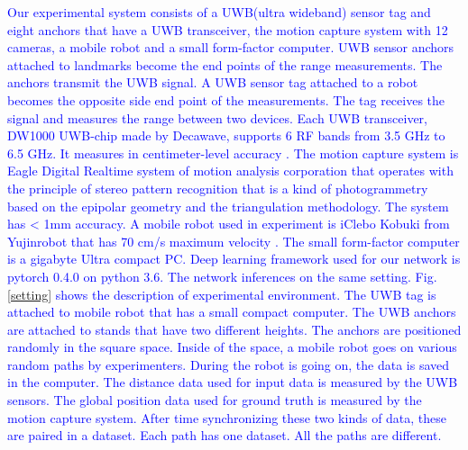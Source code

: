 \documentclass[letterpaper, 10 pt, conference]{ieeeconf}  %
\begin{document}
 \textcolor{blue}{Our experimental system consists of a UWB(ultra wideband) sensor tag and eight anchors that have a UWB transceiver, the motion capture system with 12 cameras, a mobile robot and a small form-factor computer. UWB sensor anchors attached to landmarks become the end points of the range measurements. The anchors transmit the UWB signal. A UWB sensor tag attached to a robot becomes the opposite side end point of the measurements. The tag receives the signal and measures the range between two devices. Each UWB transceiver, DW1000 UWB-chip made by Decawave, supports 6 RF bands from 3.5 GHz to 6.5 GHz. It measures in centimeter-level accuracy . The motion capture system is Eagle Digital Realtime system of motion analysis corporation that operates with the principle of stereo pattern recognition that is a kind of photogrammetry based on the epipolar geometry and the triangulation methodology. The system has < 1mm accuracy. A mobile robot used in experiment is iClebo Kobuki from Yujinrobot that has 70 cm/s maximum velocity . The small form-factor computer is a gigabyte Ultra compact PC. Deep learning framework used for our network is pytorch 0.4.0 on python 3.6. The network inferences on the same setting.
 Fig. \ref{setting} shows the description of experimental environment. The UWB tag is attached to mobile robot that has a small compact computer. The UWB anchors are attached to stands that have two different heights. The anchors are positioned randomly in the square space. Inside of the space, a mobile robot goes on various random paths by experimenters. During the robot is going on, the data is saved in the computer. The distance data used for input data is measured by the UWB sensors. The global position data used for ground truth is measured by the motion capture system. After time synchronizing these two kinds of data, these are paired in a dataset. Each path has one dataset. All the paths are different.}
\end{document}

